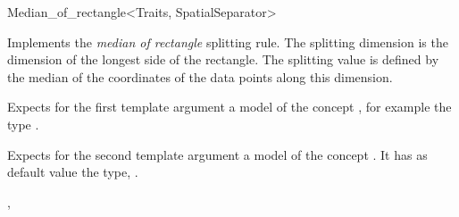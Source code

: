 
\begin{ccRefFunctionObjectClass}{Median_of_rectangle<Traits, SpatialSeparator>}

\ccDefinition
Implements the {\em median of rectangle} splitting rule.
The splitting dimension is the dimension of the longest side of the rectangle.
The splitting value is defined by the median of the coordinates of the data points
along this dimension.


\ccParameters

Expects for the first template argument a model of
the concept , for example
the type .


Expects for the second template argument a model of the concept . It has as default value
the type, .


\ccIsModel


\ccCreation
{}  %


\ccSeeAlso

,\\

\end{ccRefFunctionObjectClass}




